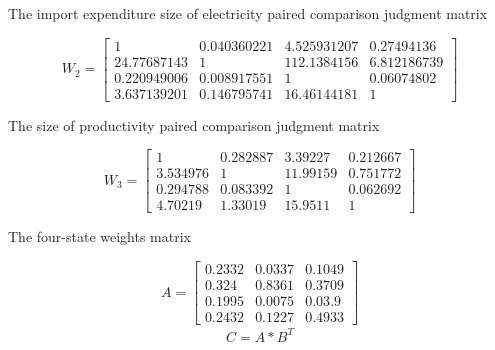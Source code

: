 \documentclass{mcmthesis}
\begin{document}
\begin{center}
	The import expenditure size of electricity  paired comparison judgment matrix
\end{center}
\[ W_{2}=\begin{bmatrix}
1&	0.040360221	&4.525931207&	0.27494136\\
24.77687143	&1&	112.1384156&	6.812186739\\
0.220949006&	0.008917551&	1&	0.06074802\\
3.637139201&	0.146795741&	16.46144181&	1
\end{bmatrix} \] 
\begin{center}
	The size of productivity paired comparison judgment matrix
\end{center}
\[W_{3}= \begin{bmatrix}
1 & 0.282887 & 3.39227 & 0.212667 \\ 
3.534976 & 1 & 11.99159 & 0.751772 \\ 
0.294788 & 0.083392 & 1 & 0.062692 \\ 
4.70219 & 1.33019 & 15.9511 & 1
\end{bmatrix}  \]
\begin{center}
	The four-state weights matrix
\end{center}
\[ A= \begin{bmatrix}
0.2332 & 0.0337 & 0.1049\\ 
0.324 & 0.8361 & 0.3709 \\ 
0.1995 & 0.0075 & 0.03.9 \\ 
0.2432& 0.1227& 0.4933
\end{bmatrix}\]
\begin{gather}
C=A*B^{T}
\end{gather}
\end{document}
